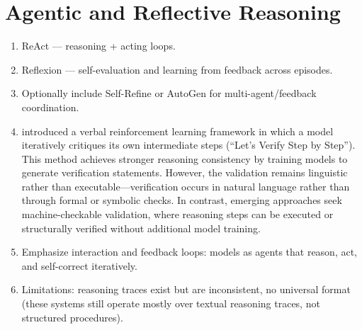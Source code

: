 \documentclass[project]{bsu-cs}  %
\begin{document}
\section{Agentic and Reflective Reasoning}\label{sec:reasoning}
\begin{enumerate}
    \item ReAct \citep{yao2023reactsynergizingreasoningacting} — reasoning + acting loops.

    \item Reflexion \citep{shinn2023reflexionlanguageagentsverbal} — self-evaluation and learning from feedback across episodes.

    \item Optionally include Self-Refine \citep{madaan2023selfrefineiterativerefinementselffeedback} or AutoGen \citep{wu2023autogenenablingnextgenllm} for multi-agent/feedback coordination.

    \item \citet{lightman2023letsverifystepstep} introduced a verbal reinforcement learning framework in which a model iteratively critiques its own intermediate steps (“Let’s Verify Step by Step”). This method achieves stronger reasoning consistency by training models to generate verification statements. However, the validation remains linguistic rather than executable—verification occurs in natural language rather than through formal or symbolic checks. In contrast, emerging approaches seek machine-checkable validation, where reasoning steps can be executed or structurally verified without additional model training.
    \item Emphasize interaction and feedback loops: models as agents that reason, act, and self-correct iteratively.

    \item Limitations: reasoning traces exist but are inconsistent, no universal format (these systems still operate mostly over textual reasoning traces, not structured procedures).

\end{enumerate}
% 
%
%
% 
\end{document}
